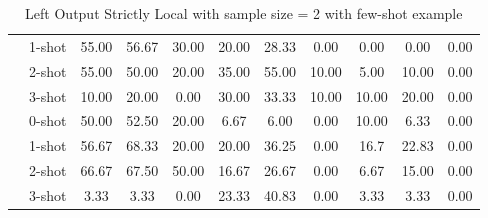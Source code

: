 \begin{table*}[t]
{\begin{tabular}{l c ccc ccc ccc}
           & 1-shot & 55.00 & 56.67 & 30.00 & 20.00 & 28.33 & 0.00 & 0.00 & 0.00 & 0.00\\
           & 2-shot & 55.00 & 50.00 & 20.00 & 35.00 & 55.00 & 10.00 & 5.00 & 10.00 & 0.00\\
           & 3-shot & 10.00 & 20.00 & 0.00 & 30.00 & 33.33 & 10.00 & 10.00 & 20.00 & 0.00\\
           \hdashline
          \multirow{4}{*}{rules = 3} & 0-shot & 50.00 & 52.50 & 20.00 & 6.67 & 6.00 & 0.00 & 10.00 & 6.33 & 0.00\\
          & 1-shot & 56.67 & 68.33 & 20.00 & 20.00 & 36.25 & 0.00 & 16.7 & 22.83 & 0.00\\
           & 2-shot & 66.67 & 67.50 & 50.00 & 16.67 & 26.67 & 0.00 & 6.67 & 15.00 & 0.00\\
           & 3-shot & 3.33 & 3.33 & 0.00 & 23.33 & 40.83 & 0.00 & 3.33 & 3.33 & 0.00\\
           \bottomrule
    \end{tabular}
    }
    \caption{Left Output Strictly Local with sample size = 2 with few-shot example}
    \label{tab:few_shot_LOSL}
\end{table*}
